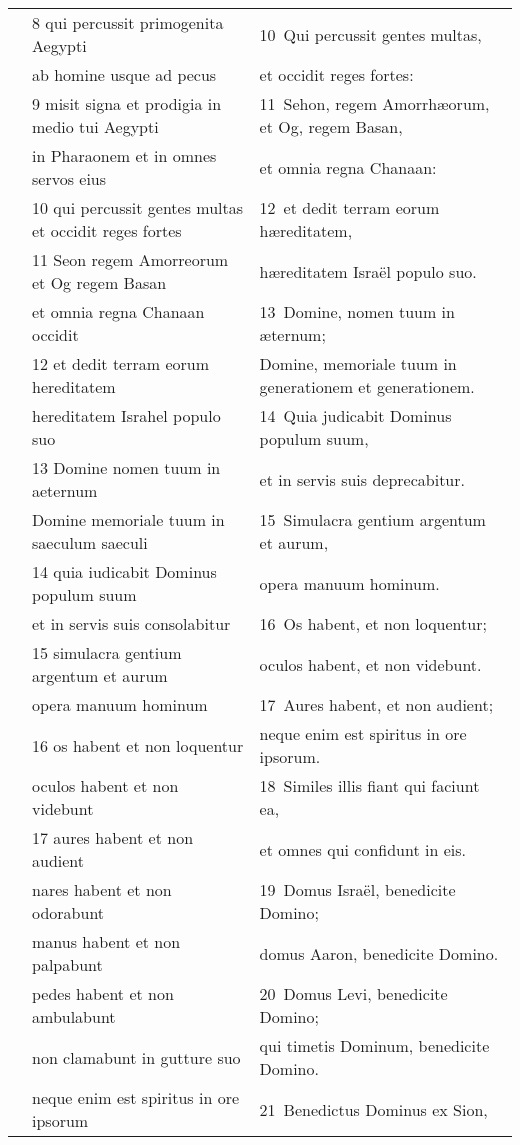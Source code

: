 \documentclass{article}
\begin{document}
\begin{longtable}{@{}p{}p{}p{}@{}}
	&	8 qui percussit primogenita Aegypti	&	10 Qui percussit gentes multas,	\\
	&	ab homine usque ad pecus	&	et occidit reges fortes:	\\
	&	9 misit signa et prodigia in medio tui Aegypti	&	11 Sehon, regem Amorrhæorum, et Og, regem Basan,	\\
	&	in Pharaonem et in omnes servos eius	&	et omnia regna Chanaan:	\\
	&	10 qui percussit gentes multas et occidit reges fortes	&	12 et dedit terram eorum hæreditatem,	\\
	&	11 Seon regem Amorreorum et Og regem Basan	&	hæreditatem Israël populo suo.	\\
	&	et omnia regna Chanaan occidit	&	13 Domine, nomen tuum in æternum;	\\
	&	12 et dedit terram eorum hereditatem	&	Domine, memoriale tuum in generationem et generationem.	\\
	&	hereditatem Israhel populo suo	&	14 Quia judicabit Dominus populum suum,	\\
	&	13 Domine nomen tuum in aeternum	&	et in servis suis deprecabitur.	\\
	&	Domine memoriale tuum in saeculum saeculi	&	15 Simulacra gentium argentum et aurum,	\\
	&	14 quia iudicabit Dominus populum suum	&	opera manuum hominum.	\\
	&	et in servis suis consolabitur	&	16 Os habent, et non loquentur;	\\
	&	15 simulacra gentium argentum et aurum	&	oculos habent, et non videbunt.	\\
	&	opera manuum hominum	&	17 Aures habent, et non audient;	\\
	&	16 os habent et non loquentur	&	neque enim est spiritus in ore ipsorum.	\\
	&	oculos habent et non videbunt	&	18 Similes illis fiant qui faciunt ea,	\\
	&	17 aures habent et non audient	&	et omnes qui confidunt in eis.	\\
	&	nares habent et non odorabunt	&	19 Domus Israël, benedicite Domino;	\\
	&	manus habent et non palpabunt	&	domus Aaron, benedicite Domino.	\\
	&	pedes habent et non ambulabunt	&	20 Domus Levi, benedicite Domino;	\\
	&	non clamabunt in gutture suo	&	qui timetis Dominum, benedicite Domino.	\\
	&	neque enim est spiritus in ore ipsorum	&	21 Benedictus Dominus ex Sion,	\\

\end{longtable}
\end{document}
